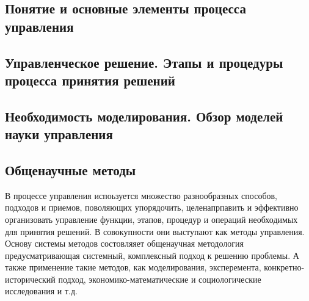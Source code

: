 \documentclass[a4paper,12pt,oneside,final]{extarticle}
\numberwithin{equation}{section}
\begin{document}
\subsection{Понятие и основные элементы процесса управления}

\subsection{Управленческое решение. Этапы и процедуры процесса принятия решений}

\subsection{Необходимость моделирования. Обзор моделей науки управления}

\subsection{Общенаучные методы}
В процессе управления испоьзуется множество разнообразных способов, подходов и приемов, поволяющих упорядочить, целенапрпавить и эффективно организовать управление функции, этапов, процедур и операций необходимых для принятия решений. 
В совокупности они выступают как методы управления. 
Основу системы методов состовляяет общенаучная методология предусматривающая системный, комплексный подход к решению проблемы. 
А также применение такие методов, как моделирования, эксперемента, конкретно-исторический подход, экономико-математические и социологические исследования и т.д.
\end{document}
